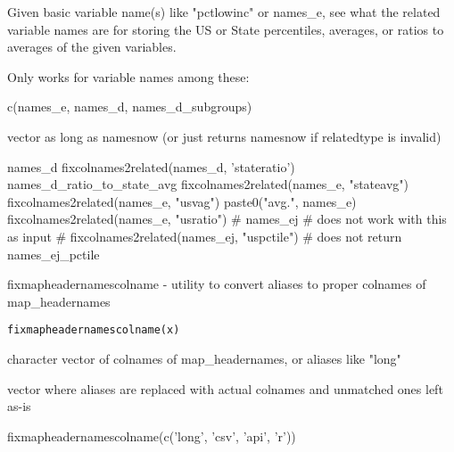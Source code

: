 \documentclass[a4paper]{book}
\begin{document}
%
\begin{Details}\relax
Given basic variable name(s) like "pctlowinc" or names\_e,
see what the related variable names are for storing the
US or State percentiles, averages, or ratios to averages
of the given variables.

Only works for variable names among these:

c(names\_e, names\_d, names\_d\_subgroups)
\end{Details}
%
\begin{Value}
vector as long as namesnow (or just returns namesnow if relatedtype is invalid)
\end{Value}
%
\begin{Examples}
\begin{ExampleCode}
names_d
fixcolnames2related(names_d, 'stateratio')
names_d_ratio_to_state_avg
fixcolnames2related(names_e, "stateavg")
fixcolnames2related(names_e, "usvag")
paste0("avg.", names_e)
fixcolnames2related(names_e, "usratio")
# names_ej # does not work with this as input
# fixcolnames2related(names_ej, "uspctile") # does not return names_ej_pctile
\end{ExampleCode}
\end{Examples}
%
\begin{Description}\relax
fixmapheadernamescolname - utility to convert aliases to proper colnames of map\_headernames
\end{Description}
%
\begin{Usage}
\begin{verbatim}
fixmapheadernamescolname(x)
\end{verbatim}
\end{Usage}
%
\begin{Arguments}
\begin{ldescription}
\item[\code{x}] character vector of colnames of map\_headernames, or aliases like "long"
\end{ldescription}
\end{Arguments}
%
\begin{Value}
vector where aliases are replaced with actual colnames and unmatched ones left as-is
\end{Value}
%
\begin{Examples}
\begin{ExampleCode}
  fixmapheadernamescolname(c('long', 'csv', 'api', 'r'))

\end{ExampleCode}
\end{Examples}
\end{document}
